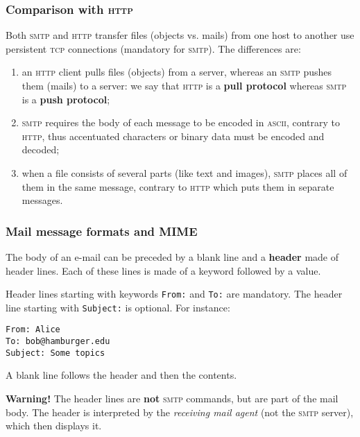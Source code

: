 %
\begin{frame}
\frametitle{Comparison with \textsc{http}}

Both \textsc{smtp} and \textsc{http} transfer files (objects
vs. mails) from one host to another use persistent \textsc{tcp}
connections (mandatory for \textsc{smtp}). The differences are:
\begin{enumerate}

  \item an \textsc{http} client pulls files (objects) from a server,
    whereas an \textsc{smtp} pushes them (mails) to a server: we say
    that \textsc{http} is a \textbf{pull protocol} whereas
    \textsc{smtp} is a \textbf{push protocol};

  \item \textsc{smtp} requires the body of each message to be encoded
    in \textsc{ascii}, contrary to \textsc{http}, thus accentuated
    characters or binary data must be encoded and decoded;

  \item when a file consists of several parts (like text and images),
    \textsc{smtp} places all of them in the same message, contrary to
    \textsc{http} which puts them in separate messages.

\end{enumerate}

\end{frame}

%
\begin{frame}[containsverbatim]
\frametitle{Mail message formats and MIME}

The body of an e-mail can be preceded by a blank line and a
\textbf{header} made of header lines. Each of these lines is made of a
keyword followed by a value.

Header lines starting with keywords \verb+From:+ and \verb+To:+ are
mandatory. The header line starting with \verb+Subject:+ is
optional. For instance:
{\small
\begin{verbatim}
From: Alice
To: bob@hamburger.edu
Subject: Some topics
\end{verbatim}
}
A blank line follows the header and then the contents.

\textbf{Warning!} The header lines are \textbf{not} \textsc{smtp}
commands, but are part of the mail body. The header is interpreted by
the \emph{receiving mail agent} (not the \textsc{smtp} server), which
then displays it.

\end{frame}

